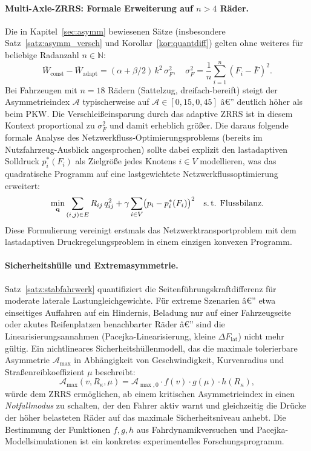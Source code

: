 ﻿\documentclass[a4paper,12pt]{article}
\theoremstyle{definition}
\begin{document}
\paragraph{Multi-Axle-ZRRS: Formale Erweiterung auf $n > 4$ Räder.}
Die in Kapitel~\ref{sec:asymm} bewiesenen Sätze
(insbesondere Satz~\ref{satz:asymm_versch} und Korollar~\ref{kor:quantdiff})
gelten ohne weiteres für beliebige Radanzahl $n \in \mathbb{N}$:
\[
    \overline{W}_{\text{const}} - \overline{W}_{\text{adapt}}
    = (\alpha + \beta/2)\,k^2\,\sigma^2_F,
    \quad
    \sigma^2_F = \frac{1}{n}\sum_{i=1}^{n}(F_i - \bar{F})^2.
\]
Bei Fahrzeugen mit $n = 18$ Rädern (Sattelzug, dreifach-bereift)
steigt der Asymmetrieindex $\mathcal{A}$ typischerweise auf
$\mathcal{A} \in [0{,}15, 0{,}45]$ â€” deutlich höher als beim PKW.
Die Verschleißeinsparung durch das adaptive ZRRS ist in
diesem Kontext proportional zu $\sigma_F^2$ und damit erheblich
größer. Die daraus folgende formale Analyse des Netzwerk\-fluss-Optimierungs\-problems
(bereits im Nutzfahrzeug-Ausblick angesprochen) sollte dabei explizit
den lastadaptiven Solldruck $p^*_i(F_i)$ als Zielgröße jedes Knotens
$i \in V$ modellieren, was das quadratische Programm auf eine
lastgewichtete Netzwerkflussoptimierung erweitert:
\[
    \min_{\mathbf{q}} \sum_{(i,j)\in E} R_{ij}\,q_{ij}^2
    + \gamma \sum_{i \in V} \bigl(p_i - p^*_i(F_i)\bigr)^2
    \quad \text{s.\,t. Flussbilanz.}
\]
Diese Formulierung vereinigt erstmals das Netzwerktransportproblem mit dem
lastadaptiven Druckregelungsproblem in einem einzigen konvexen Programm.

\paragraph{Sicherheitshülle und Extremasymmetrie.}
Satz~\ref{satz:stabfahrwerk} quantifiziert die Seitenführungs\-kraftdifferenz
für moderate laterale Lastungleichgewichte. Für extreme Szenarien â€”
etwa einseitiges Auffahren auf ein Hindernis, Beladung nur auf
einer Fahrzeugseite oder akutes Reifenplatzen benachbarter Räder â€” sind
die Linearisierungsannahmen (Pacejka-Linearisierung, kleine
$\Delta F_{\text{lat}}$) nicht mehr gültig. Ein nichtlineares Sicherheits\-hüllenmodell,
das die maximale tolerierbare Asymmetrie $\mathcal{A}_{\max}$ in Abhängigkeit
von Geschwindigkeit, Kurvenradius und Straßenreibkoeffizient $\mu$ beschreibt:
\[
    \mathcal{A}_{\max}(v, R_{\kappa}, \mu)
    = \mathcal{A}_{\max,0} \cdot f(v)\cdot g(\mu) \cdot h(R_{\kappa}),
\]
würde dem ZRRS ermöglichen, ab einem kritischen Asymmetrieindex in einen
\emph{Notfallmodus} zu schalten, der den Fahrer aktiv warnt und
gleichzeitig die Drücke der höher belasteten Räder auf das maximale
Sicherheitsniveau anhebt. Die Bestimmung der Funktionen $f, g, h$ aus
Fahrdynamikversuchen und Pacejka-Modellsimulationen \cite{pacejka}
ist ein konkretes experimentelles Forschungsprogramm.
\end{document}
